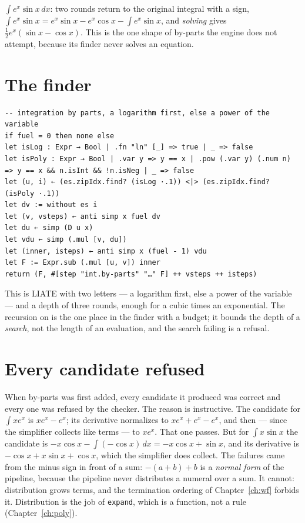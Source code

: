 \begin{example}
  $\int e^x \sin x\,dx$: two rounds return to the original integral with a sign,
  $\int e^x \sin x = e^x \sin x - e^x \cos x - \int e^x \sin x$, and \emph{solving} gives
  $\frac{1}{2} e^x(\sin x - \cos x)$. This is the one shape of by-parts the engine does not
  attempt, because its finder never solves an equation.
\end{example}

\section{The finder}

\begin{verbatim}
-- integration by parts, a logarithm first, else a power of the variable
if fuel = 0 then none else
let isLog : Expr → Bool | .fn "ln" [_] => true | _ => false
let isPoly : Expr → Bool | .var y => y == x | .pow (.var y) (.num n) => y == x && n.isInt && !n.isNeg | _ => false
let (u, i) ← (es.zipIdx.find? (isLog ·.1)) <|> (es.zipIdx.find? (isPoly ·.1))
let dv := without es i
let (v, vsteps) ← anti simp x fuel dv
let du ← simp (D u x)
let vdu ← simp (.mul [v, du])
let (inner, isteps) ← anti simp x (fuel - 1) vdu
let F := Expr.sub (.mul [u, v]) inner
return (F, #[step "int.by-parts" "…" F] ++ vsteps ++ isteps)
\end{verbatim}

This is LIATE with two letters --- a logarithm first, else a power of the variable --- and a
depth of three rounds, enough for a cubic times an exponential. The recursion on
 is the one place in the finder with a budget; it bounds the depth of a
\emph{search}, not the length of an evaluation, and the search failing is a refusal.

\section{Every candidate refused}

When by-parts was first added, every candidate it produced was correct and every one was
refused by the checker. The reason is instructive. The candidate for $\int x e^x$ is
$x e^x - e^x$; its derivative normalizes to $x e^x + e^x - e^x$, and then --- since the simplifier
collects like terms --- to $x e^x$. That one passes. But for $\int x \sin x$ the candidate is
$-x \cos x - \int (-\cos x)\,dx = -x\cos x + \sin x$, and its derivative is
$-\cos x + x \sin x + \cos x$, which the simplifier does collect. The failures came from the
minus sign in front of a sum: $-(a + b) + b$ is a \emph{normal form} of the pipeline, because
the pipeline never distributes a numeral over a sum. It cannot: distribution grows terms, and
the termination ordering of Chapter~\ref{ch:wf} forbids it. Distribution is the job of
\texttt{expand}, which is a function, not a rule (Chapter~\ref{ch:poly}).

